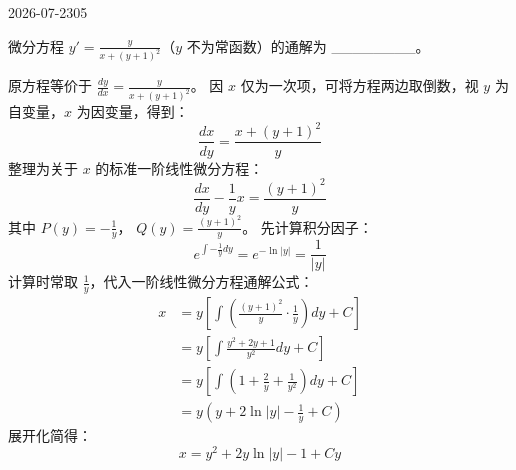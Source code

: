 \begin{mistake}{2026-07-23}{05}

\begin{problemcontent}
微分方程 $y' = \frac{y}{x + (y+1)^2}$（$y$ 不为常函数）的通解为 \_\_\_\_\_\_\_\_。
\end{problemcontent}

\begin{solutioncontent}
原方程等价于 $\frac{dy}{dx} = \frac{y}{x + (y+1)^2}$。
因 $x$ 仅为一次项，可将方程两边取倒数，视 $y$ 为自变量，$x$ 为因变量，得到：
\[ \frac{dx}{dy} = \frac{x + (y+1)^2}{y} \]
整理为关于 $x$ 的标准一阶线性微分方程：
\[ \frac{dx}{dy} - \frac{1}{y}x = \frac{(y+1)^2}{y} \]
其中 $P(y) = -\frac{1}{y}$， $Q(y) = \frac{(y+1)^2}{y}$。
先计算积分因子：
\[ e^{\int -\frac{1}{y} dy} = e^{-\ln|y|} = \frac{1}{|y|} \]
计算时常取 $\frac{1}{y}$，代入一阶线性微分方程通解公式：
\[ \begin{aligned} x &= y \left[ \int \left( \frac{(y+1)^2}{y} \cdot \frac{1}{y} \right) dy + C \right] \\ &= y \left[ \int \frac{y^2 + 2y + 1}{y^2} dy + C \right] \\ &= y \left[ \int \left( 1 + \frac{2}{y} + \frac{1}{y^2} \right) dy + C \right] \\ &= y \left( y + 2\ln|y| - \frac{1}{y} + C \right) \end{aligned} \]
展开化简得：
\[ x = y^2 + 2y\ln|y| - 1 + Cy \]
\end{solutioncontent}


\end{mistake}
